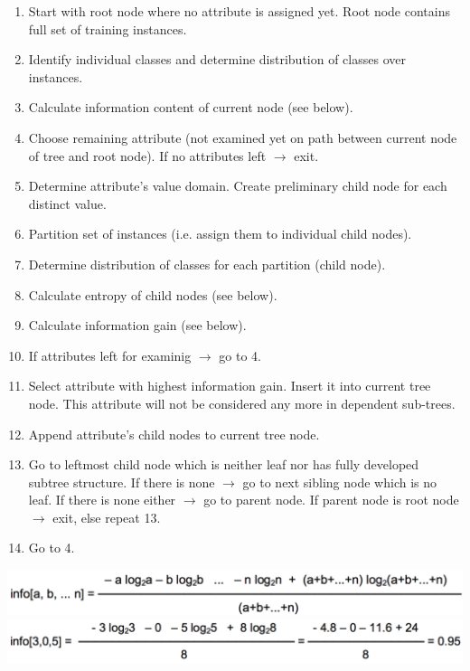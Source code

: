 \begin{breakbox}
\begin{enumerate}
	\item Start with root node where no attribute is assigned yet. Root node contains full set of training instances.
	\item Identify individual classes and determine distribution of classes over instances.
	\item Calculate information content of current node (see below).
	\item Choose remaining attribute (not examined yet on path between current node of tree and root node). If no attributes left $\rightarrow$ exit.
	\item Determine attribute's value domain. Create preliminary child node for each distinct value.
	\item Partition set of instances (i.e. assign them to individual child nodes).
	\item Determine distribution of classes for each partition (child node).
	\item Calculate entropy of child nodes (see below).
	\item Calculate information gain (see below).
	\item If attributes left for examinig $\rightarrow$ go to 4.
	\item Select attribute with highest information gain. Insert it into current tree node. This attribute will not be considered any more in dependent sub-trees.
	\item Append attribute's child nodes to current tree node.
	\item Go to leftmost child node which is neither leaf nor has fully developed subtree structure. If there is none $\rightarrow$ go to next sibling node which is no leaf. If there is none either $\rightarrow$ go to parent node. If parent node is root node $\rightarrow$ exit, else repeat 13.
	\item Go to 4.
\end{enumerate}

\begin{breakbox}
\begin{center}
\includegraphics[width=.15\textwidth]{slides_images/information_content}
\includegraphics[width=.15\textwidth]{slides_images/information_content_example}
\end{center}
\end{breakbox}


\end{breakbox}
